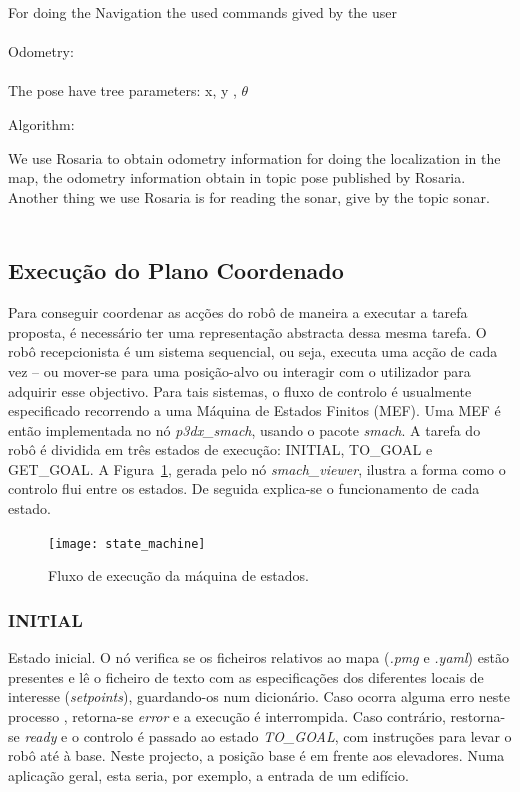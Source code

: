 \documentclass[journal]{IEEEtran}
\begin{document}

	For doing the Navigation the used commands gived by the user
	\\
	\\
	Odometry:
	\\
	\\
	The pose have tree parameters: x, y , $\theta$




	Algorithm:







	We use Rosaria to obtain odometry information for doing the localization in the map, the odometry information obtain in topic pose published by Rosaria.
	Another thing we use Rosaria is for reading the sonar, give by the topic sonar.
	\\
	\\

\subsection{Execução do Plano Coordenado}

Para conseguir coordenar as acções do robô de maneira a executar a tarefa proposta, é necessário ter uma representação abstracta dessa mesma tarefa. O robô recepcionista é um sistema sequencial, ou seja, executa uma acção de cada vez -- ou mover-se para uma posição-alvo ou interagir com o utilizador para adquirir esse objectivo. Para tais sistemas, o fluxo de controlo é usualmente especificado recorrendo a uma Máquina de Estados Finitos (MEF).
Uma MEF é então implementada no nó \textit{p3dx\_smach}, usando o pacote \textit{smach}. A tarefa do robô é dividida em três estados de execução: INITIAL, TO\_GOAL e GET\_GOAL. A Figura~\ref{fig: maquina_estados}, gerada pelo nó \textit{smach\_viewer}, ilustra a forma como o controlo flui entre os estados. De seguida explica-se o funcionamento de cada estado.

\begin{figure}[ht]
	\centering
	\texttt{[image: state\_machine]}
	\caption{Fluxo de execução da máquina de estados.}
	\label{fig: maquina_estados}
\end{figure}

\subsubsection{INITIAL} Estado inicial. O nó verifica se os ficheiros relativos ao mapa (\textit{.pmg} e \textit{.yaml}) estão presentes e lê o ficheiro de texto com as especificações dos diferentes locais de interesse (\textit{setpoints}), guardando-os num dicionário. Caso ocorra alguma erro neste processo , retorna-se \textit{error} e a execução é interrompida. Caso contrário, restorna-se \textit{ready} e o controlo é passado ao estado \textit{TO\_GOAL}, com instruções para levar o robô até à base. Neste projecto, a posição base é em frente aos elevadores. Numa aplicação geral, esta seria, por exemplo, a entrada de um edifício.
\end{document}
